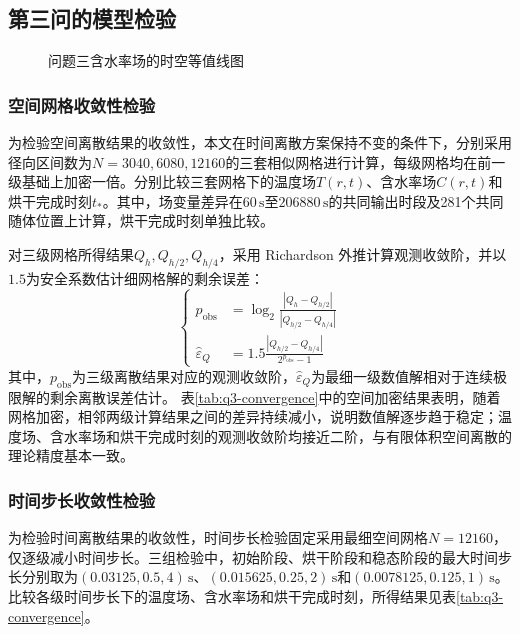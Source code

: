 \documentclass[withoutpreface,bwprint]{cumcmthesis}
\begin{document}
\subsection{第三问的模型检验}

\begin{figure}[H]
\centering

\caption{问题三含水率场的时空等值线图}
\label{fig:q3-contours}
\end{figure}

\subsubsection{空间网格收敛性检验}

为检验空间离散结果的收敛性，本文在时间离散方案保持不变的条件下，分别采用径向区间数为$N=3040,6080,12160$的三套相似网格进行计算，每级网格均在前一级基础上加密一倍。分别比较三套网格下的温度场$T(r,t)$、含水率场$C(r,t)$和烘干完成时刻$t_*$。其中，场变量差异在$60\,\mathrm s$至$206880\,\mathrm s$的共同输出时段及281个共同随体位置上计算，烘干完成时刻单独比较。

对三级网格所得结果$Q_h,Q_{h/2},Q_{h/4}$，采用 Richardson 外推计算观测收敛阶，并以$1.5$为安全系数估计细网格解的剩余误差\cite{roache1998}：
\begin{equation}
\left\{
\begin{aligned}
p_{\mathrm{obs}}
&=\log_2\frac{|Q_h-Q_{h/2}|}{|Q_{h/2}-Q_{h/4}|}\\
\widehat\varepsilon_Q
&=1.5\frac{|Q_{h/2}-Q_{h/4}|}{2^{p_{\mathrm{obs}}}-1}
\end{aligned}
\right.
\label{eq:q3-richardson-estimate}
\end{equation}
其中，$p_{\mathrm{obs}}$为三级离散结果对应的观测收敛阶，$\widehat\varepsilon_Q$为最细一级数值解相对于连续极限解的剩余离散误差估计。
表\ref{tab:q3-convergence}中的空间加密结果表明，随着网格加密，相邻两级计算结果之间的差异持续减小，说明数值解逐步趋于稳定；温度场、含水率场和烘干完成时刻的观测收敛阶均接近二阶，与有限体积空间离散的理论精度基本一致。

\subsubsection{时间步长收敛性检验}

为检验时间离散结果的收敛性，时间步长检验固定采用最细空间网格$N=12160$，仅逐级减小时间步长。三组检验中，初始阶段、烘干阶段和稳态阶段的最大时间步长分别取为$(0.03125,0.5,4)\,\mathrm s$、$(0.015625,0.25,2)\,\mathrm s$和$(0.0078125,0.125,1)\,\mathrm s$。比较各级时间步长下的温度场、含水率场和烘干完成时刻，所得结果见表\ref{tab:q3-convergence}。
\end{document}
